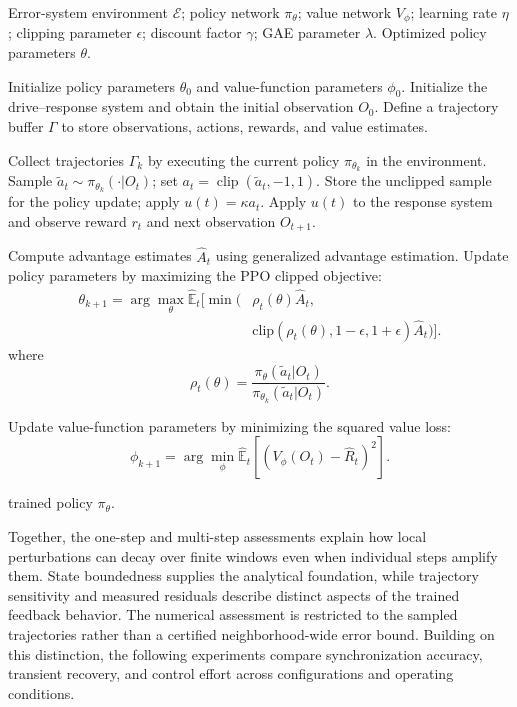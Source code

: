 \documentclass[a4paper,fleqn]{cas-dc}
\theoremstyle{plain}
\theoremstyle{definition}
\begin{document}
\begin{algorithm}[t]
	\caption{PPO-based Single-Input Pinning Control for the Error System}
	\label{alg:ppo_pinning}
	\begin{algorithmic}[1]
		\Require Error-system environment $\mathcal{E}$; policy network $\pi_{\theta}$; value network $V_{\phi}$; learning rate $\eta$; clipping parameter $\epsilon$; discount factor $\gamma$; GAE parameter $\lambda$.
		\Ensure Optimized policy parameters $\theta$.
		
		\State Initialize policy parameters $\theta_0$ and value-function parameters $\phi_0$.
		\State Initialize the drive--response system and obtain the initial observation $O_0$.
		\State Define a trajectory buffer $\Gamma$ to store observations, actions, rewards, and value estimates.
		
		\State Collect trajectories $\Gamma_k$ by executing the current policy $\pi_{\theta_k}$ in the environment.
		\State Sample $\widetilde a_t \sim \pi_{\theta_k}(\cdot|O_t)$; set $a_t=\operatorname{clip}(\widetilde a_t,-1,1)$.
		\State Store the unclipped sample for the policy update; apply $u(t)=\kappa a_t$.
		\State Apply $u(t)$ to the response system and observe reward $r_t$ and next observation $O_{t+1}$.
		\EndFor
		
		\State Compute advantage estimates $\hat{A}_t$ using generalized advantage estimation.
		\State Update policy parameters by maximizing the PPO clipped objective:
		\Statex
		\[
		\begin{aligned}
			\theta_{k+1}=\arg\max_{\theta}\hat{\mathbb{E}}_t\Big[
			\min\big(&\rho_t(\theta)\hat{A}_t,\\
			&\mathrm{clip}(\rho_t(\theta),1-\epsilon,1+\epsilon)\hat{A}_t\big)
			\Big].
		\end{aligned}
		\]
		\Statex
		where
		\[
		\rho_t(\theta)
		=\frac{\pi_{\theta}(\widetilde a_t|O_t)}
		{\pi_{\theta_k}(\widetilde a_t|O_t)}.
		\]
		
		\State Update value-function parameters by minimizing the squared value loss:
		\Statex
		\[
		\phi_{k+1}
		=
		\arg\min_{\phi}
		\hat{\mathbb{E}}_t
		\left[
		\left(
		V_{\phi}(O_t)-\hat{R}_t
		\right)^2
		\right].
		\]
		\EndFor
		
		\State \Return trained policy $\pi_{\theta}$.
	\end{algorithmic}
\end{algorithm}

Together, the one-step and multi-step assessments explain how local perturbations can decay over finite windows even when individual steps amplify them. State boundedness supplies the analytical foundation, while trajectory sensitivity and measured residuals describe distinct aspects of the trained feedback behavior. The numerical assessment is restricted to the sampled trajectories rather than a certified neighborhood-wide error bound. Building on this distinction, the following experiments compare synchronization accuracy, transient recovery, and control effort across configurations and operating conditions. 
\end{document}
